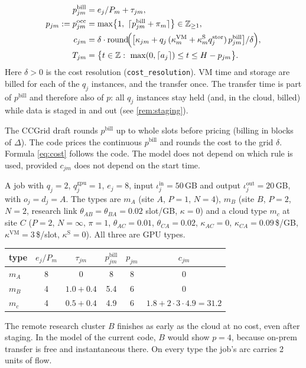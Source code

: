 \documentclass[11pt,a4paper]{article}
\newcommand{\Z}{\mathbb{Z}}
\newcommand{\code}[1]{\texttt{#1}}
\newcommand{\pin}{\mathrm{in}}
\newcommand{\pout}{\mathrm{out}}
\newcommand{\bill}{\mathrm{bill}}
\newcommand{\occ}{\mathrm{occ}}
\begin{document}
\begin{align}
  p^\bill_{jm} &= e_j/P_m+\tau_{jm},
  \label{eq:pbill}\\
  p_{jm} := p^\occ_{jm} &= \max\bigl\{1,\ \lceil p^\bill_{jm}+\pi_m\rceil\bigr\}\in\Z_{\ge1},
  \label{eq:pocc}\\
  c_{jm} &= \delta\cdot\operatorname{round}\!\Bigl(
     \bigl[\kappa_{jm}
     + q_j\,(\kappa^{\mathrm{VM}}_m+\kappa^{\mathrm{S}}_m q^{\mathrm{stor}}_j)\,p^\bill_{jm}\bigr]/\delta\Bigr),
  \label{eq:cost}\\
  T_{jm} &= \bigl\{t\in\Z:\ \max(0,\lceil a_j\rceil)\le t\le H-p_{jm}\bigr\}.
  \label{eq:T}
\end{align}
Here $\delta>0$ is the cost resolution (\code{cost\_resolution}). VM time and
storage are billed for each of the $q_j$ instances, and the transfer once.
The transfer time is part of $p^\bill$ and therefore also of $p$: all $q_j$
instances stay held (and, in the cloud, billed) while data is staged in and
out (see \cref{rem:staging}).

\begin{remark}
The CCGrid draft rounds $p^\bill$ up to whole slots before pricing (billing in
blocks of $\Delta$). The code prices the continuous $p^\bill$ and rounds the
cost to the grid $\delta$. Formula \eqref{eq:cost} follows the code. The
model does not depend on which rule is used, provided $c_{jm}$ does not depend
on the start time.
\end{remark}

\begin{example}\label{ex:one}
A job with $q_j=2$, $q^{\mathrm{gpu}}_j=1$, $e_j=8$, input
$\iota^\pin_j=50$\,GB and output $\iota^\pout_j=20$\,GB, with $o_j=d_j=A$.
The types are
$m_A$ (site $A$, $P=1$, $N=4$), $m_B$ (site $B$, $P=2$, $N=2$, research
link $\theta_{AB}=\theta_{BA}=0.02$ slot/GB, $\kappa=0$) and a cloud type $m_c$ at
site $C$ ($P=2$, $N=\infty$, $\pi=1$, $\theta_{AC}=0.01$, $\theta_{CA}=0.02$,
$\kappa_{AC}=0$, $\kappa_{CA}=0.09$\,\$/GB, $\kappa^{\mathrm{VM}}=3$\,\$/slot,
$\kappa^{\mathrm{S}}=0$). All three are GPU types.

\begin{center}
\begin{tabular}{@{}lccccc@{}}
\toprule
type & $e_j/P_m$ & $\tau_{jm}$ & $p^\bill_{jm}$ & $p_{jm}$ & $c_{jm}$ \\
\midrule
$m_A$ & 8 & 0 & 8 & 8 & 0 \\
$m_B$ & 4 & $1.0+0.4$ & 5.4 & 6 & 0 \\
$m_c$ & 4 & $0.5+0.4$ & 4.9 & 6 & $1.8+2\cdot3\cdot4.9=31.2$ \\
\bottomrule
\end{tabular}
\end{center}
The remote research cluster $B$ finishes as early as the cloud at no cost, even
after staging. In the model of the current code, $B$ would show $p=4$, because
on-prem transfer is free and instantaneous there. On every type the job's arc
carries 2 units of flow.
\end{example}
\end{document}
